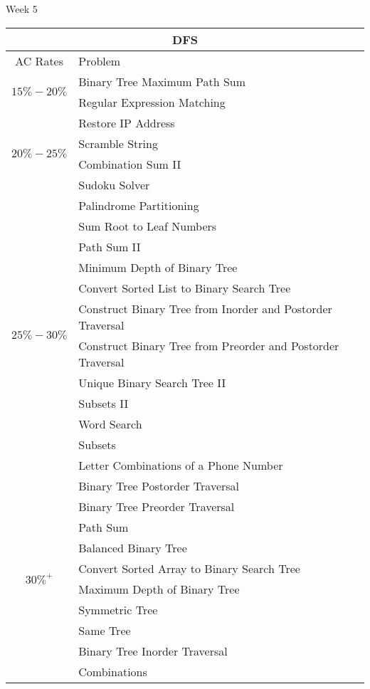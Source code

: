 \documentclass[paper=a4, fontsize=11pt]{scrartcl} %
\begin{document}
\begin{center}
  \pagebreak

  \begin{center}
    Week 5
  \end{center}

  \begin{tabular}{|c|l|}
      \hline
      \multicolumn{2}{|c|}{DFS} \\
      \hline
      AC Rates      &   Problem     \\
      \hline
      \multirow{2}{*}{$15\%-20\%$}  &    Binary Tree Maximum Path Sum  \\
          & Regular Expression Matching \\
      \hline
      \multirow{4}{*}{$20\%-25\%$}  &    Restore IP Address  \\
          & Scramble String  \\
          & Combination Sum II  \\
          & Sudoku Solver  \\
      \hline
      \multirow{12}{*}{$25\%-30\%$}  &    Palindrome Partitioning  \\
          & Sum Root to Leaf Numbers \\
          & Path Sum II \\
          & Minimum Depth of Binary Tree    \\
          & Convert Sorted List to Binary Search Tree   \\
          & Construct Binary Tree from Inorder and Postorder Traversal  \\
          & Construct Binary Tree from Preorder and Postorder Traversal  \\
          & Unique Binary Search Tree II    \\
          & Subsets II  \\
          & Word Search \\
          & Subsets \\
          & Letter Combinations of a Phone Number   \\
      \hline
      \multirow{10}{*}{$30\%^+$}  &  Binary Tree Postorder Traversal    \\
          & Binary Tree Preorder Traversal  \\
          & Path Sum    \\
          & Balanced Binary Tree    \\
          & Convert Sorted Array to Binary Search Tree  \\
          & Maximum Depth of Binary Tree    \\
          & Symmetric Tree  \\
          & Same Tree   \\
          & Binary Tree Inorder Traversal   \\
          & Combinations    \\
      \hline
  \end{tabular}


\end{center}
\end{document}
